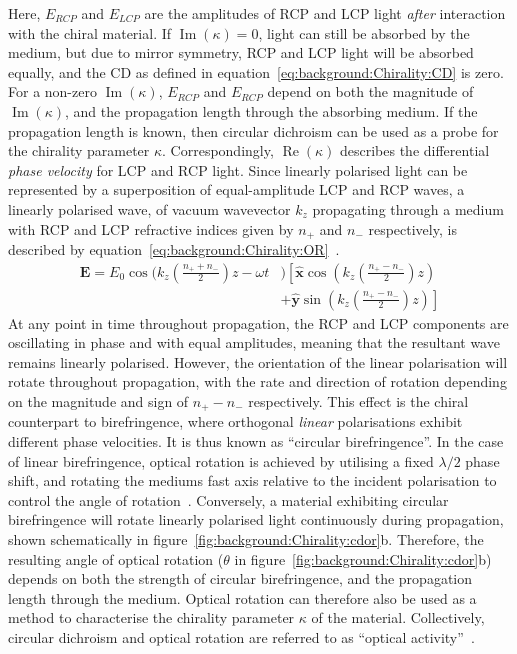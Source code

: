 Here, $E_{RCP}$ and $E_{LCP}$ are the amplitudes of RCP and LCP light \textit{after} interaction with the chiral material. If $\operatorname{Im}(\kappa) = 0$, light can still be absorbed by the medium, but due to mirror symmetry, RCP and LCP light will be absorbed equally, and the CD as defined in equation~\ref{eq:background:Chirality:CD} is zero. For a non-zero $\operatorname{Im}(\kappa)$, $E_{RCP}$ and $E_{RCP}$ depend on both the magnitude of $\operatorname{Im}(\kappa)$, and the propagation length through the absorbing medium. If the propagation length is known, then circular dichroism can be used as a probe for the chirality parameter $\kappa$.
Correspondingly, $\operatorname{Re}(\kappa)$ describes the differential \textit{phase velocity} for LCP and RCP light. Since linearly polarised light can be represented by a superposition of equal-amplitude LCP and RCP waves, a linearly polarised wave, of vacuum wavevector $k_z$ propagating through a medium with RCP and LCP refractive indices given by $n_+$ and $n_-$ respectively, is described by equation~\ref{eq:background:Chirality:OR}~\cite[\S 8.10]{Hecht2013}.
\begin{equation}\label{eq:background:Chirality:OR}
    \begin{split}
        \mathbf{E} = E_0 \cos(k_z (\frac{n_+ + n_-}{2})z -\omega t &) \left[ \mathbf{\hat{x}} \cos(k_z (\frac{n_+ - n_-}{2})z ) \right. \\
        & \left. + \mathbf{\hat{y}} \sin(k_z (\frac{n_+ - n_-}{2}) z)\right]
    \end{split}
\end{equation}
At any point in time throughout propagation, the RCP and LCP components are oscillating in phase and with equal amplitudes, meaning that the resultant wave remains linearly polarised. However, the orientation of the linear polarisation will rotate throughout propagation, with the rate and direction of rotation depending on the magnitude and sign of $n_+ - n_-$ respectively. This effect is the chiral counterpart to birefringence, where orthogonal \textit{linear} polarisations exhibit different phase velocities. It is thus known as ``circular birefringence''. In the case of linear birefringence, optical rotation is achieved by utilising a fixed $\lambda/2$ phase shift, and rotating the mediums fast axis relative to the incident polarisation to control the angle of rotation~\cite[A3.10]{Atkins2010}. Conversely, a material exhibiting circular birefringence will rotate linearly polarised light continuously during propagation, shown schematically in figure~\ref{fig:background:Chirality:cdor}b. Therefore, the resulting angle of optical rotation ($\theta$ in figure~\ref{fig:background:Chirality:cdor}b) depends on both the strength of circular birefringence, and the propagation length through the medium. Optical rotation can therefore also be used as a method to characterise the chirality parameter $\kappa$ of the material. Collectively, circular dichroism and optical rotation are referred to as ``optical activity''~\cite[\S 8.10]{Hecht2013}.

